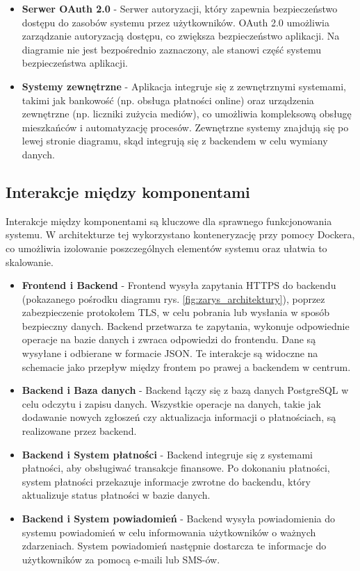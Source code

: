 \begin{itemize}
	\item \textbf{Serwer OAuth 2.0} - Serwer autoryzacji, który zapewnia bezpieczeństwo dostępu do zasobów systemu przez użytkowników. OAuth 2.0 umożliwia zarządzanie autoryzacją dostępu, co zwiększa bezpieczeństwo aplikacji. Na diagramie nie jest bezpośrednio zaznaczony, ale stanowi część systemu bezpieczeństwa aplikacji.

	\item \textbf{Systemy zewnętrzne} - Aplikacja integruje się z zewnętrznymi systemami, takimi jak bankowość (np. obsługa płatności online) oraz urządzenia zewnętrzne (np. liczniki zużycia mediów), co umożliwia kompleksową obsługę mieszkańców i automatyzację procesów. Zewnętrzne systemy znajdują się po lewej stronie diagramu, skąd integrują się z backendem w celu wymiany danych.


\end{itemize}

\subsection{Interakcje między komponentami}

Interakcje między komponentami są kluczowe dla sprawnego funkcjonowania systemu. W architekturze tej wykorzystano konteneryzację przy pomocy Dockera, co umożliwia izolowanie poszczególnych elementów systemu oraz ułatwia to skalowanie.

\begin{itemize} 
	\item \textbf{Frontend i Backend} - Frontend wysyła zapytania HTTPS do backendu (pokazanego pośrodku diagramu rys. \ref{fig:zarys_architektury}), poprzez zabezpieczenie protokołem TLS, w celu pobrania lub wysłania w sposób bezpieczny danych. Backend przetwarza te zapytania, wykonuje odpowiednie operacje na bazie danych i zwraca odpowiedzi do frontendu. Dane są wysyłane i odbierane w formacie JSON. Te interakcje są widoczne na schemacie jako przepływ między frontem po prawej a backendem w centrum.
	
	\item \textbf{Backend i Baza danych} - Backend łączy się z bazą danych PostgreSQL w celu odczytu i zapisu danych. Wszystkie operacje na danych, takie jak dodawanie nowych zgłoszeń czy aktualizacja informacji o płatnościach, są realizowane przez backend.

	\item \textbf{Backend i System płatności} - Backend integruje się z systemami płatności, aby obsługiwać transakcje finansowe. Po dokonaniu płatności, system płatności przekazuje informacje zwrotne do backendu, który aktualizuje status płatności w bazie danych.

	\item \textbf{Backend i System powiadomień} - Backend wysyła powiadomienia do systemu powiadomień w celu informowania użytkowników o ważnych zdarzeniach. System powiadomień następnie dostarcza te informacje do użytkowników za pomocą e-maili lub SMS-ów.

\end{itemize}


